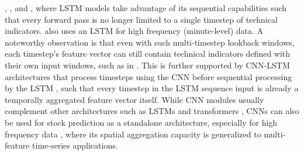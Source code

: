 \documentclass[stu,floatsintext]{apa7}
\begin{document}
\textcite{gu2024predicting}, \textcite{kim2019forecasting}, \textcite{sarkar2025hybrid} and \textcite{karadas2025multimodal}, where LSTM models take advantage of its sequential capabilities such that every forward pass is no longer limited to a single timestep of technical indicators. \textcite{yao2018highfrequency} also uses an LSTM for high frequency (minute-level) data. A noteworthy observation is that even with such multi-timestep lookback windows, each timestep's feature vector can still contain technical indicators defined with their own input windows, such as in \textcite{chen2024deep}. This is further supported by CNN-LSTM architectures that process timesteps using the CNN before sequential processing by the LSTM \textcite{liu2025hybrid}, such that every timestep in the LSTM sequence input is already a temporally aggregated feature vector itself. While CNN modules usually complement other architectures such as LSTMs and transformers \textcite{mandal2023enhancing}, CNNs can also be used for stock prediction as a standalone architecture, especially for high frequency data \textcite{zaznov2024intraday}, where its spatial aggregation capacity is generalized to multi-feature time-series applications.
\end{document}
